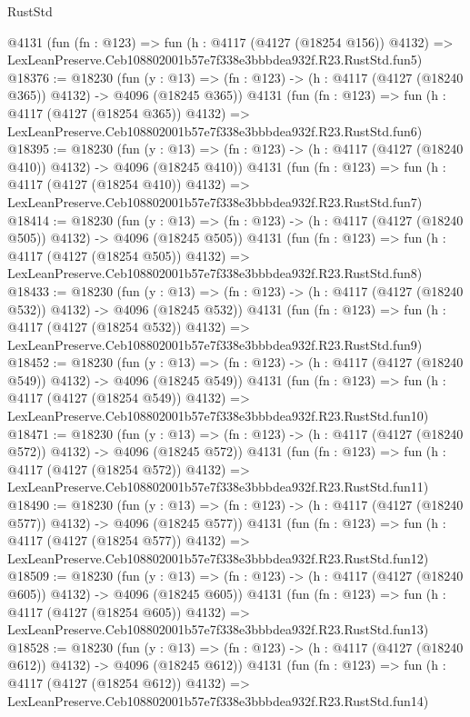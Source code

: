 \begin{lexlean}{RustStd}
\begin{coremodule}
    @4131
    (fun (fn : @123) =>
    fun (h : @4117 (@4127 (@18254 @156)) @4132) =>
    LexLeanPreserve.Ceb108802001b57e7f338e3bbbdea932f.R23.RustStd.fun5)
@18376 := @18230
    (fun (y : @13) => (fn : @123) -> (h : @4117 (@4127 (@18240 @365)) @4132) -> @4096 (@18245 @365))
    @4131
    (fun (fn : @123) =>
    fun (h : @4117 (@4127 (@18254 @365)) @4132) =>
    LexLeanPreserve.Ceb108802001b57e7f338e3bbbdea932f.R23.RustStd.fun6)
@18395 := @18230
    (fun (y : @13) => (fn : @123) -> (h : @4117 (@4127 (@18240 @410)) @4132) -> @4096 (@18245 @410))
    @4131
    (fun (fn : @123) =>
    fun (h : @4117 (@4127 (@18254 @410)) @4132) =>
    LexLeanPreserve.Ceb108802001b57e7f338e3bbbdea932f.R23.RustStd.fun7)
@18414 := @18230
    (fun (y : @13) => (fn : @123) -> (h : @4117 (@4127 (@18240 @505)) @4132) -> @4096 (@18245 @505))
    @4131
    (fun (fn : @123) =>
    fun (h : @4117 (@4127 (@18254 @505)) @4132) =>
    LexLeanPreserve.Ceb108802001b57e7f338e3bbbdea932f.R23.RustStd.fun8)
@18433 := @18230
    (fun (y : @13) => (fn : @123) -> (h : @4117 (@4127 (@18240 @532)) @4132) -> @4096 (@18245 @532))
    @4131
    (fun (fn : @123) =>
    fun (h : @4117 (@4127 (@18254 @532)) @4132) =>
    LexLeanPreserve.Ceb108802001b57e7f338e3bbbdea932f.R23.RustStd.fun9)
@18452 := @18230
    (fun (y : @13) => (fn : @123) -> (h : @4117 (@4127 (@18240 @549)) @4132) -> @4096 (@18245 @549))
    @4131
    (fun (fn : @123) =>
    fun (h : @4117 (@4127 (@18254 @549)) @4132) =>
    LexLeanPreserve.Ceb108802001b57e7f338e3bbbdea932f.R23.RustStd.fun10)
@18471 := @18230
    (fun (y : @13) => (fn : @123) -> (h : @4117 (@4127 (@18240 @572)) @4132) -> @4096 (@18245 @572))
    @4131
    (fun (fn : @123) =>
    fun (h : @4117 (@4127 (@18254 @572)) @4132) =>
    LexLeanPreserve.Ceb108802001b57e7f338e3bbbdea932f.R23.RustStd.fun11)
@18490 := @18230
    (fun (y : @13) => (fn : @123) -> (h : @4117 (@4127 (@18240 @577)) @4132) -> @4096 (@18245 @577))
    @4131
    (fun (fn : @123) =>
    fun (h : @4117 (@4127 (@18254 @577)) @4132) =>
    LexLeanPreserve.Ceb108802001b57e7f338e3bbbdea932f.R23.RustStd.fun12)
@18509 := @18230
    (fun (y : @13) => (fn : @123) -> (h : @4117 (@4127 (@18240 @605)) @4132) -> @4096 (@18245 @605))
    @4131
    (fun (fn : @123) =>
    fun (h : @4117 (@4127 (@18254 @605)) @4132) =>
    LexLeanPreserve.Ceb108802001b57e7f338e3bbbdea932f.R23.RustStd.fun13)
@18528 := @18230
    (fun (y : @13) => (fn : @123) -> (h : @4117 (@4127 (@18240 @612)) @4132) -> @4096 (@18245 @612))
    @4131
    (fun (fn : @123) =>
    fun (h : @4117 (@4127 (@18254 @612)) @4132) =>
    LexLeanPreserve.Ceb108802001b57e7f338e3bbbdea932f.R23.RustStd.fun14)

\end{coremodule}
\end{lexlean}
